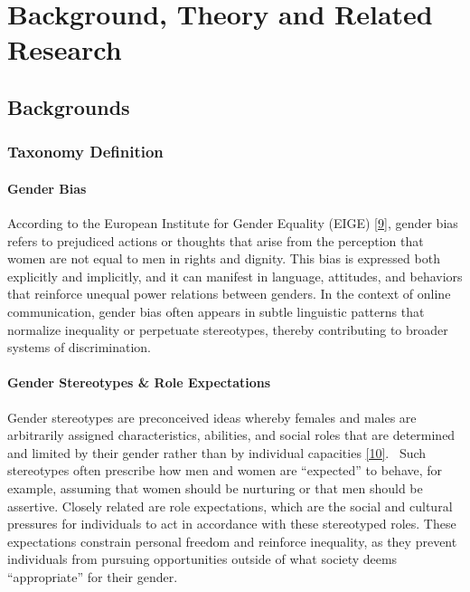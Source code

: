 \documentclass[12pt,oneside,openright,a4paper]{cpe-english-project}
\begin{document}
\chapter{Background, Theory and Related Research}

\section{Backgrounds}

\subsection{Taxonomy Definition}

\subsubsection{Gender Bias}

According to the European Institute for Gender Equality (EIGE) \hyperlink{bib:ref9}{[9]}, gender bias refers to prejudiced actions or thoughts that arise from the perception that women are not equal to men in rights and dignity. This bias is expressed both explicitly and implicitly, and it can manifest in language, attitudes, and behaviors that reinforce unequal power relations between genders. In the context of online communication, gender bias often appears in subtle linguistic patterns that normalize inequality or perpetuate stereotypes, thereby contributing to broader systems of discrimination.

\subsubsection{Gender Stereotypes \& Role Expectations}

Gender stereotypes are preconceived ideas whereby females and males are arbitrarily assigned characteristics, abilities, and social roles that are determined and limited by their gender rather than by individual capacities \hyperlink{bib:ref10}{[10]}. ~Such stereotypes often prescribe how men and women are “expected” to behave, for example, assuming that women should be nurturing or that men should be assertive. Closely related are role expectations, which are the social and cultural pressures for individuals to act in accordance with these stereotyped roles. These expectations constrain personal freedom and reinforce inequality, as they prevent individuals from pursuing opportunities outside of what society deems “appropriate” for their gender.
\end{document}
